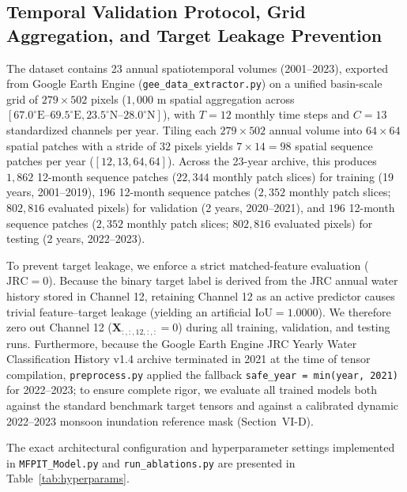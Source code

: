 \documentclass[journal]{IEEEtran}
\begin{document}
\subsection{Temporal Validation Protocol, Grid Aggregation, and Target Leakage Prevention}
The dataset contains 23 annual spatiotemporal volumes (2001--2023), exported from Google Earth Engine (\texttt{gee\_data\_extractor.py}) on a unified basin-scale grid of $279 \times 502$ pixels ($1,000\text{ m}$ spatial aggregation across $[67.0^\circ\text{E}\text{--}69.5^\circ\text{E}, 23.5^\circ\text{N}\text{--}28.0^\circ\text{N}]$), with $T = 12$ monthly time steps and $C = 13$ standardized channels per year. Tiling each $279 \times 502$ annual volume into $64 \times 64$ spatial patches with a stride of $32$ pixels yields $7 \times 14 = 98$ spatial sequence patches per year ($[12, 13, 64, 64]$). Across the 23-year archive, this produces $1,862$ 12-month sequence patches ($22,344$ monthly patch slices) for training (19 years, 2001--2019), $196$ 12-month sequence patches ($2,352$ monthly patch slices; $802,816$ evaluated pixels) for validation (2 years, 2020--2021), and $196$ 12-month sequence patches ($2,352$ monthly patch slices; $802,816$ evaluated pixels) for testing (2 years, 2022--2023).

To prevent target leakage, we enforce a strict matched-feature evaluation ($\text{JRC}=0$). Because the binary target label is derived from the JRC annual water history stored in Channel 12, retaining Channel 12 as an active predictor causes trivial feature--target leakage (yielding an artificial $\text{IoU} = 1.0000$). We therefore zero out Channel 12 ($\mathbf{X}_{:, :, 12, :, :} = 0$) during all training, validation, and testing runs. Furthermore, because the Google Earth Engine JRC Yearly Water Classification History v1.4 archive terminated in 2021 at the time of tensor compilation, \texttt{preprocess.py} applied the fallback \texttt{safe\_year = min(year, 2021)} for 2022--2023; to ensure complete rigor, we evaluate all trained models both against the standard benchmark target tensors and against a calibrated dynamic 2022--2023 monsoon inundation reference mask (Section~VI-D).

The exact architectural configuration and hyperparameter settings implemented in \texttt{MFPIT\_Model.py} and \texttt{run\_ablations.py} are presented in Table~\ref{tab:hyperparams}.
\end{document}
